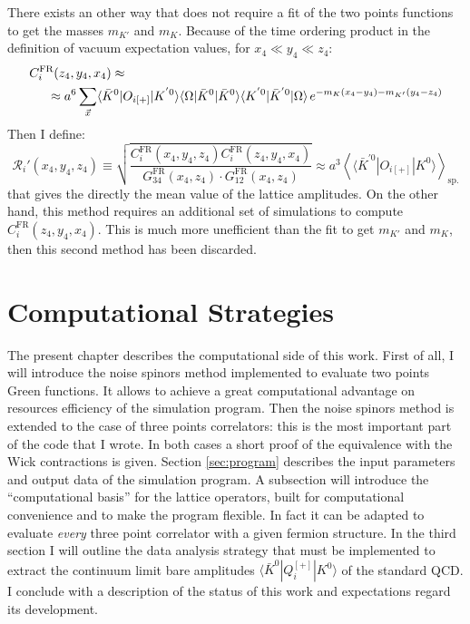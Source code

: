 \documentclass[english, LaM, oneside, noexaminfo]{sapthesis}
\newcommand{\la}{\langle}
\newcommand{\ra}{\rangle}
\begin{document}
There exists an other way that does not require a fit of the two points functions to get the masses $m_{K'}$ and $m_K$.
Because of the time ordering product in the definition of vacuum expectation values, for $x_4 \ll y_4 \ll z_4$:
\begin{equation*}
    \begin{split}
        & C_i^\text{FR}(z_4,y_4,x_4)\approx \\
        & \hspace*{5mm} \approx a^6\sum_{\vec x} \la \bar K^0 | O_{i[+]} | K^{'0} \ra  \la \Omega | \bar K^0 | \bar K^0 \ra  \la K^{'0} | \bar K^{'0} | \Omega \ra  \hspace*{.5mm} e^{-m_{K}(x_4-y_4)-m_{K'}(y_4-z_4)}  \\
    \end{split}
\end{equation*}
Then I define:
\begin{equation*}
    \mathcal{R}_i' (x_4,y_4,z_4) \equiv \sqrt{\frac{C_i^\text{FR}(x_4,y_4,z_4) C_i^\text{FR}(z_4,y_4,x_4)}{G_{34}^\text{FR}(x_4,z_4) \cdot G_{12}^\text{FR}(x_4,z_4)}} \approx a^3 \left\la \la \bar K^{'0} | O_{i[+]} | K^0 \ra \right\ra_\text{sp.}
\end{equation*}
that gives the directly the mean value of the lattice amplitudes.
On the other hand, this method requires an additional set of simulations to compute $C_i^\text{FR}(z_4,y_4,x_4)$.
This is much more unefficient than the fit to get $m_{K'}$ and $m_K$, then this second method has been discarded.

\chapter{Computational Strategies}
\lettrine[lines=2, findent=3pt, nindent=0pt]{T}{}he present chapter describes the computational side of this work.
First of all, I will introduce the noise spinors method implemented to evaluate two points Green functions.
It allows to achieve a great computational advantage on resources efficiency of the simulation program.
Then the noise spinors method is extended to the case of three points correlators: this is the most important part of the code that I wrote.
In both cases a short proof of the equivalence with the Wick contractions is given.
Section \ref{sec:program} describes the input parameters and output data of the simulation program.
A subsection will introduce the ``computational basis'' for the lattice operators, built for computational convenience and to make the program flexible.
In fact it can be adapted to evaluate {\it every} three point correlator with a given fermion structure.
In the third section I will outline the data analysis strategy that must be implemented to extract the continuum limit bare amplitudes $\la \bar K^0 | Q_i^{[+]} | K^0 \ra $ of the standard QCD.
I conclude with a description of the status of this work and expectations regard its development.
\end{document}
